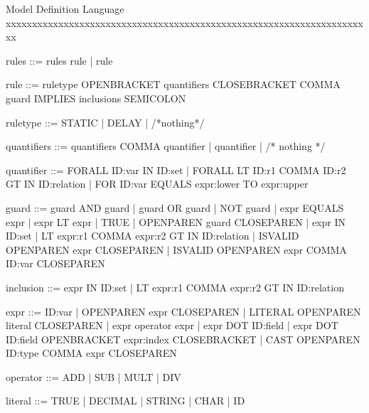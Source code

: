 Model Definition Language
xxxxxxxxxxxxxxxxxxxxxxxxxxxxxxxxxxxxxxxxxxxxxxxxxxxxxxxxxxxxxxxxxxxxxx

rules ::= rules rule | rule

rule ::= ruletype OPENBRACKET quantifiers CLOSEBRACKET COMMA guard IMPLIES inclusions SEMICOLON

ruletype ::= STATIC | DELAY | /*nothing*/

quantifiers ::= quantifiers COMMA quantifier | quantifier | /* nothing */

quantifier ::= FORALL ID:var IN ID:set 
	     | FORALL LT ID:r1 COMMA ID:r2 GT IN ID:relation
	     | FOR ID:var EQUALS expr:lower TO expr:upper

guard ::= guard AND guard
        | guard OR guard
        | NOT guard
        | expr EQUALS expr
        | expr LT expr
        | TRUE
        | OPENPAREN guard CLOSEPAREN
        | expr IN ID:set
        | LT expr:r1 COMMA expr:r2 GT IN ID:relation
        | ISVALID OPENPAREN expr CLOSEPAREN
        | ISVALID OPENPAREN expr COMMA ID:var CLOSEPAREN

inclusion ::= expr IN ID:set
	    | LT expr:r1 COMMA expr:r2 GT IN ID:relation



expr ::= ID:var 
       | OPENPAREN expr CLOSEPAREN 
       | LITERAL OPENPAREN literal CLOSEPAREN
       | expr operator expr
       | expr DOT ID:field
       | expr DOT ID:field OPENBRACKET expr:index CLOSEBRACKET
       | CAST OPENPAREN ID:type COMMA expr CLOSEPAREN 

operator ::= ADD | SUB | MULT | DIV

literal ::= TRUE | DECIMAL | STRING | CHAR | ID

